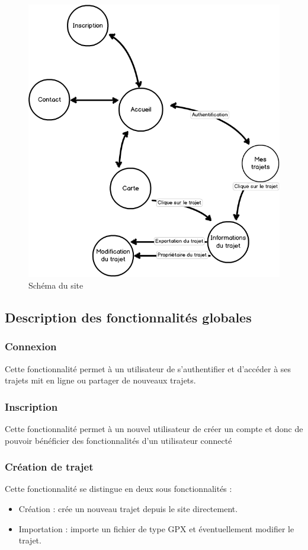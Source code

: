 \documentclass[a4paper]{article}
\begin{document}
\begin{figure}[h]
\centering
\includegraphics[width=\textwidth]{./Images/ShemaSite.png}
\caption{Schéma du site}
\end{figure}

\subsection{Description des fonctionnalités globales}
\subsubsection{Connexion}
Cette fonctionnalité permet à un utilisateur de s'authentifier et d'accéder à ses trajets mit en ligne ou partager de nouveaux trajets.

\subsubsection{Inscription}
Cette fonctionnalité permet à un nouvel utilisateur de créer un compte et donc de pouvoir bénéficier des fonctionnalités d'un utilisateur connecté

\subsubsection{Création de trajet}
Cette fonctionnalité se distingue en deux sous fonctionnalités : 
\begin{itemize}
    \item Création : crée un nouveau trajet depuis le site directement.
    \item Importation : importe un fichier de type GPX et éventuellement modifier le trajet.
\end{itemize}
\end{document}
